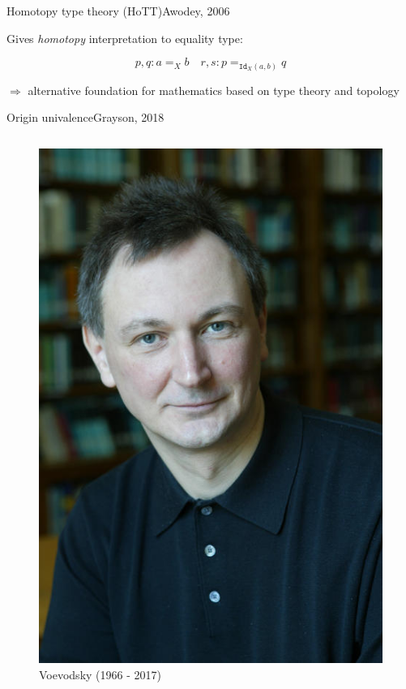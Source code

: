 \documentclass[english]{beamer}
\begin{document}
\begin{frame}{Homotopy type theory (HoTT)}{Awodey, 2006}



Gives \emph{homotopy} interpretation to equality type:

\centering
$$ p,q : a =_X b \quad r,s : p =_{\texttt{Id}_X(a,b)} q$$ 




$\Rightarrow$ alternative foundation for mathematics based on type theory and topology

\end{frame}




\begin{frame}{Origin univalence}{Grayson, 2018}

\begin{columns}[c]
        \begin{center}
            \begin{figure}[h!]
                \includegraphics[height=.7\textheight]{figures/voevodsky.jpg}
                \caption{Voevodsky (1966 - 2017)}
            \end{figure} 
        \end{center}


\end{columns}
\end{frame}
\end{document}
